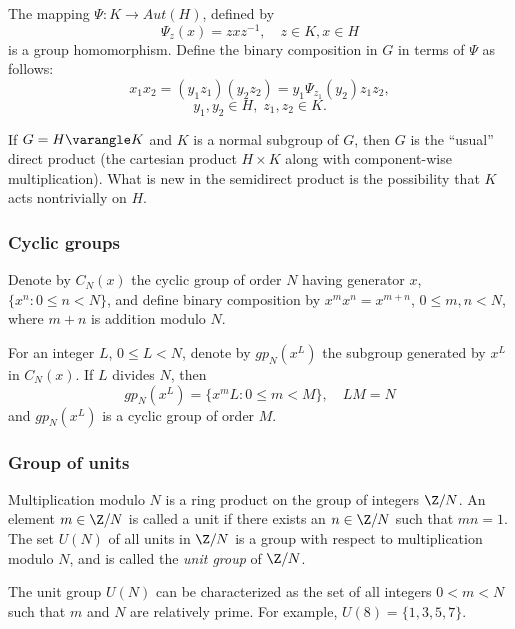 
The mapping $\Psi: K \to Aut(H)$, defined by 
\[
\Psi_z(x) = zxz^{-1}, \quad z\in K, x\in H
\]
is a group homomorphism. 
Define the binary composition in $G$
in terms of $\Psi$ as follows:
\[
x_1x_2 = (y_1z_1)(y_2z_2)= y_1\Psi_{z_1}(y_2)z_1z_2,
\]
\[y_1, y_2 \in H,\; z_1, z_2 \in K. \]

If $G = H\varangle K$ and $K$ is a normal subgroup of $G$,
then $G$ is the ``usual'' direct product (\ie the
cartesian product $H\times K$ along with component-wise
multiplication). What is new in the semidirect product is
the possibility that $K$ acts nontrivially on $H$.

\subsubsection{Cyclic groups}
Denote by $C_N(x)$ the cyclic group of order $N$ having
generator $x$, $\{ x^n : 0 \leq n < N\}$, and define binary
composition by $x^m x^n = x^{m+n}$, $0\leq m, n < N$, where
$m+n$ is addition modulo $N$.  

For an integer $L$, $ 0\leq L < N$, denote by $gp_N(x^L)$
the subgroup generated by $x^L$ in $C_N(x)$. If $L$ divides
$N$, then  
\[
gp_N(x^L) = \{x^mL : 0\leq m < M\}, \quad LM = N
\]
and $gp_N(x^L)$ is a cyclic group of order $M$.

\subsubsection{Group of units}
Multiplication modulo $N$ is a ring product on the group of
integers $\Z/N$. An element $m\in \Z/N$ is called a unit if
there exists an $n\in \Z/N$ such that $mn = 1$.  The set
$U(N)$ of all units in $\Z/N$ is a group with respect to
multiplication modulo $N$, and is called the 
\emph{unit group} of $\Z/N$. 

The unit group $U(N)$ can be characterized as the
set of all integers $0<m<N$ such that $m$ and $N$ are
relatively prime.  For example, $U(8) = \{1, 3, 5, 7\}$.

